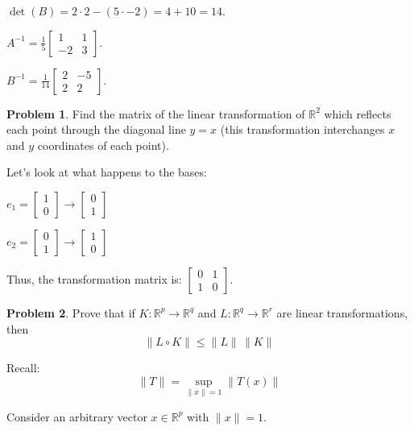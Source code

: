 \documentclass[12]{amsart}
\theoremstyle{definition}
\newtheorem{xca}{Problem}
\newcommand{\R}{\mathbb{R}}
\newcommand{\sskip}{\newpage}
\newcommand{\norm}[1]{\lVert#1\rVert}
\begin{document}
$\det(B) = 2 \cdot 2 - (5 \cdot -2) = 4 + 10 = 14$.

$A^{-1} = \frac{1}{5} \begin{bmatrix}
    1 & 1 \\
    -2 & 3
\end{bmatrix}$.

$B^{-1} = \frac{1}{14} \begin{bmatrix}
    2 & -5 \\
    2 & 2
\end{bmatrix}$.

\sskip

\begin{xca}
Find the matrix of the linear transformation of $\R^2$ which reflects each point through the diagonal line $y=x$ (this transformation
interchanges $x$ and $y$ coordinates of each point).
\end{xca}


Let's look at what happens to the bases:

$e_1 = \begin{bmatrix}
    1 \\
    0
\end{bmatrix} \to \begin{bmatrix}
    0 \\
    1
\end{bmatrix}$

$e_2 = \begin{bmatrix}
    0 \\
    1
\end{bmatrix} \to \begin{bmatrix}
    1 \\
    0
\end{bmatrix}$


Thus, the transformation matrix is: $\begin{bmatrix}
    0 & 1 \\
    1 & 0
\end{bmatrix}$.



\sskip



\begin{xca}
Prove that if $K:\R^p \to \R^q$ and $L:\R^q\to \R^r$ are linear transformations, then
$$
\norm{L\circ K}\leq \norm{L}\,\norm{K}
$$
\end{xca}


Recall:
\[\norm{T} = \sup_{\norm{x} = 1} \norm{T(x)}\]


Consider an arbitrary vector $x \in \R^p$ with $\norm{x} = 1$.
\end{document}
